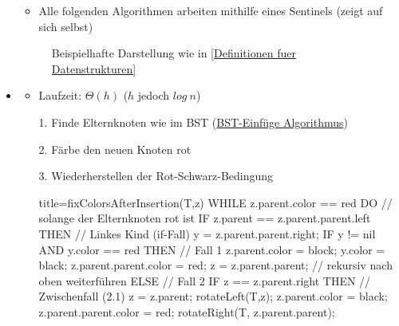 \documentclass[
    12pt,
    a4paper,
    ngerman,
    color=3b,%
    marginpar=false,
    colorback=false,
    leqno,
]{tudaexercise}
\begin{document}
\begin{itemize}
\begin{itemize}
\begin{itemize}
                    \end{itemize}
                \item Alle folgenden Algorithmen arbeiten mithilfe eines Sentinels (zeigt auf sich selbst)
            \end{itemize}
            \begin{figure}[ht]
                \centering
                \caption{Beispielhafte Darstellung wie in \ref{Definitionen fuer Datenstrukturen}}
                \label{fig:red_black_tree_example}
            \end{figure}
            \clearpage
        \item {}
            \begin{itemize}
                \item Laufzeit: $\Theta(h)$ ($h$ jedoch $log~n$)
                \item[1.] Finde Elternknoten wie im BST (\hyperref[BST-Insert]{BST-Einfüge Algorithmus})
                \item[2.] Färbe den neuen Knoten rot
                \item[3.] Wiederherstellen der Rot-Schwarz-Bedingung
                            \begin{ccode}[autogobble,fontsize=\small]{title={fixColorsAfterInsertion(T,z)}}
                            WHILE z.parent.color == red DO                  // solange der Elternknoten rot ist
                                IF z.parent == z.parent.parent.left THEN    // Linkes Kind (if-Fall)
                                    y = z.parent.parent.right;
                                    IF y != nil AND y.color == red THEN     // Fall 1
                                        z.parent.color = block;
                                        y.color = black;
                                        z.parent.parent.color = red;
                                        z = z.parent.parent;                // rekursiv nach oben weiterführen
                                    ELSE                                    // Fall 2
                                        IF z == z.parent.right THEN         // Zwischenfall (2.1)
                                            z = z.parent;
                                            rotateLeft(T,z);
                                        z.parent.color = black;
                                        z.parent.parent.color = red;
                                        rotateRight(T, z.parent.parent);

\end{ccode}
\end{itemize}
\end{itemize}
\end{document}
